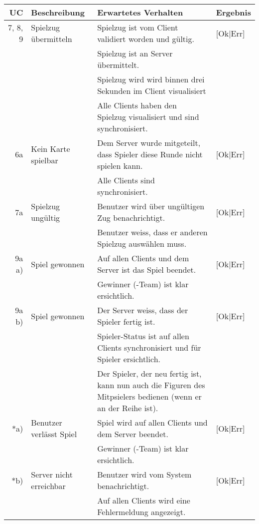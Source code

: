 \documentclass[12pt,halfparskip]{scrartcl}
\begin{document}
	\begin {tabular}{r | p{3cm} | p{8cm} | l}
		\toprule
		\textbf{UC} & \textbf{Beschreibung} & \textbf{Erwartetes Verhalten} & \textbf{Ergebnis} \\
		\midrule
		7, 8, 9 & Spielzug übermitteln & Spielzug ist vom Client validiert worden und gültig. & [Ok|Err] \\
		 \cline{3-4} & & Spielzug ist an Server übermittelt. & \\
		 \cline{3-4} & & Spielzug wird wird binnen drei Sekunden im Client visualisiert & \\
		 \cline{3-4} & & Alle Clients haben den Spielzug visualisiert und sind synchronisiert. & \\
		\midrule
		6a & Kein Karte spielbar & Dem Server wurde mitgeteilt, dass Spieler diese Runde nicht spielen kann. & [Ok|Err] \\
		 \cline{3-4} & & Alle Clients sind synchronisiert. & \\
		\midrule
		7a & Spielzug ungültig & Benutzer wird über ungültigen Zug benachrichtigt. & [Ok|Err] \\
		 \cline{3-4} & & Benutzer weiss, dass er anderen Spielzug auswählen muss. & \\
		\midrule
		9a a) & Spiel gewonnen & Auf allen Clients und dem Server ist das Spiel beendet. & [Ok|Err] \\
		 \cline{3-4} & & Gewinner (-Team) ist klar ersichtlich. & \\
		\midrule
		9a b) & Spiel gewonnen & Der Server weiss, dass der Spieler fertig ist. & [Ok|Err] \\
		 \cline{3-4} & & Spieler-Status ist auf allen Clients synchronisiert und für Spieler ersichtlich. & \\
		 \cline{3-4} & & Der Spieler, der neu fertig ist, kann nun auch die Figuren des Mitpsielers bedienen (wenn er an der Reihe ist). & \\
		\midrule
		*a) & Benutzer verlässt Spiel & Spiel wird auf allen Clients und dem Server beendet. & [Ok|Err] \\
		 \cline{3-4} & & Gewinner (-Team) ist klar ersichtlich. & \\
		\midrule
		*b) & Server nicht erreichbar & Benutzer wird vom System benachrichtigt. & [Ok|Err] \\
		 \cline{3-4} & & Auf allen Clients wird eine Fehlermeldung angezeigt. & \\
		\bottomrule
	\end{tabular}
	
\end{document}
